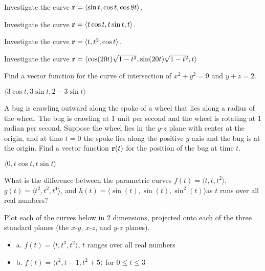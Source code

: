 \begin{exercises}

\begin{exercise} Investigate the curve ${\bf r}=\langle \sin t,\cos t,\cos
8t\rangle$.

\begin{exercise} Investigate the curve 
${\bf r}=\langle t\cos t,t\sin t,t\rangle$.

\begin{exercise} Investigate the curve 
${\bf r}=\langle t,t^2,\cos t\rangle$.

\begin{exercise} Investigate the curve 
${\bf r}=\langle \cos(20t)\sqrt{1-t^2},\sin(20t)\sqrt{1-t^2},t\rangle$

\begin{exercise} Find a vector function for the curve of intersection of
$x^2+y^2=9$ and $y+z=2$.
\begin{answer} $\langle 3\cos t, 3\sin t, 2-3\sin t\rangle$
\end{answer}\end{exercise}

\begin{exercise} A bug is crawling outward along the spoke of a wheel that lies along
a radius of the wheel. The bug is crawling at 1 unit per second and
the wheel is rotating at 1 radian per second. Suppose the wheel lies
in the $y$-$z$ plane with center at the origin, and at time $t=0$ the
spoke lies along the positive $y$ axis and the bug is at the origin.
Find a vector function ${\bf r}(t)$
for the position of the bug at time $t$.
\begin{answer} $\langle 0,t\cos t,t\sin t\rangle$
\end{answer}\end{exercise}

\begin{exercise} What is the difference between the parametric curves
$f(t)=\langle t, t, t^2 \rangle$, $g(t)=\langle t^2, t^2, t^4
\rangle$, and $h(t)=\langle \sin(t), \sin(t), \sin^2(t) \rangle$as $t$
runs over all real numbers?

\begin{exercise} Plot each of the curves below in 2 dimensions, projected
onto each of the three standard planes (the $x$-$y$, $x$-$z$, and
$y$-$z$ planes).

\begin{itemize} %
\item{a.} $f(t)=\langle t, t^3, t^2 \rangle$, $t$ ranges over all real numbers
\item{b.} $f(t)=\langle t^2, t-1, t^2+5 \rangle$  for $0\leq t \leq 3$
\end{itemize}


\end{exercise}
\end{exercise}
\end{exercise}
\end{exercise}
\end{exercise}
\end{exercise}
\end{exercises}
